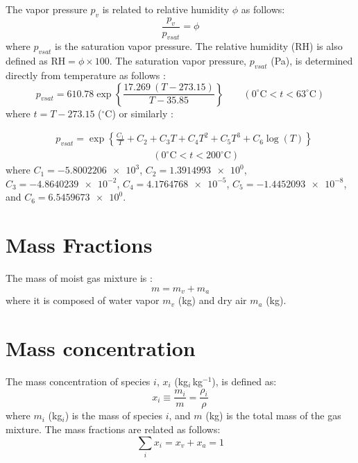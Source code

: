 The vapor pressure $p_v$ is related to relative humidity $\phi$ as follows:
\begin{equation}
\frac{p_v}{p_{\textit{vsat}}} = \phi
\end{equation}
where $p_{\textit{vsat}}$ is the saturation vapor pressure. The relative humidity (RH) is also defined as $\textrm{RH}=\phi\times 100$. The saturation vapor pressure, $p_{\textit{vsat}}$ (Pa), is determined directly from temperature as follows \citep{Singh2002}:
\begin{equation}
p_{vsat} = 610.78 \exp \left\{\frac{17.269\ (T - 273.15)}{T - 35.85}\right\} \qquad (0^{\circ}\mathrm{C} < t < 63^{\circ}\mathrm{C})
\end{equation}
where $t = T - 273.15$ ($^{\circ}$C) or similarly \citep{ASHRAE2013}:

\begin{align}
&p_{vsat} = \exp \left\{\frac{C_1}{T} + C_2 + C_3 T + C_4 T^2 + C_5 T^3 + C_6 \log(T)\right\}\\
& \hspace{10em} (0^{\circ}\mathrm{C} < t < 200^{\circ}\mathrm{C})
\end{align}
where $C_1 = \num{-5.8002206e3}$, $C_2 = \num{1.3914993e0}$, $C_3 = \num{-4.8640239e-2}$, $C_4 = \num{4.1764768e-5}$, $C_5 = \num{-1.4452093e-8}$, and $C_6 = \num{6.5459673e0}$.

\section*{Mass Fractions}

The mass of moist gas mixture is :
\begin{equation}
m = m_v + m_a
\end{equation}
where it is composed of water vapor $m_v$ (kg) and dry air $m_a$ (kg).

\section*{Mass concentration}

The mass concentration of species $i$, $x_i$ (kg$_i$\,kg$^{-1}$), is defined as:
\begin{equation}
x_i \equiv \frac{m_i}{m} = \frac{\rho_i}{\rho}
\end{equation}
where $m_i$ (kg$_i$) is the mass of species $i$, and $m$ (kg) is the total mass of the gas mixture. The mass fractions are related as follows:
\begin{equation}
\sum_i x_i = x_v + x_a = 1
\label{eq:totalconc}
\end{equation}

